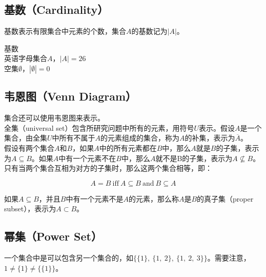 \documentclass[12pt, openany, oneside]{book}
\begin{document}
\vspace{0.5cm}

\subsection{基数（Cardinality）}

基数表示有限集合中元素的个数，集合$ A $的基数记为$ |A| $。

\begin{tcolorbox}
	基数\\
	英语字母集合$ A $，$ |A| = 26 $\\
	空集$ \emptyset $，$ |\emptyset| = 0 $
\end{tcolorbox}

\vspace{0.5cm}

\subsection{韦恩图（Venn Diagram）}

集合还可以使用韦恩图来表示。\\

全集（universal set）包含所研究问题中所有的元素，用符号$ U $表示。假设$ A $是一个集合，由全集$ U $中所有不属于$ A $的元素组成的集合，称为$ A $的补集，表示为$ \overline A $。\\

假设有两个集合$ A $和$ B $，如果$ A $中的所有元素都在$ B $中，那么$ A $就是$ B $的子集，表示为$ A \subseteq B $。如果$ A $中有一个元素不在$ B $中，那么$ A $就不是B的子集，表示为$ A \nsubseteq B $。只有当两个集合互相为对方的子集时，那么这两个集合相等，即：

\vspace{-0.5cm}

$$
	A = B\ \text{iff}\ A \subseteq B\ \text{and}\ B \subseteq A
$$

如果$ A \subseteq B $，并且$ B $中有一个元素不是$ A $的元素，那么称$ A $是$ B $的真子集（proper subset），表示为$ A \subset B $。\\

\subsection{幂集（Power Set）}

一个集合中是可以包含另一个集合的，如$ \{\{1\},\ \{1,\ 2\},\ \{1,\ 2,\ 3\}\} $。需要注意，$ 1 \neq \{1\} \neq \{\{1\}\} $。\\
\end{document}
